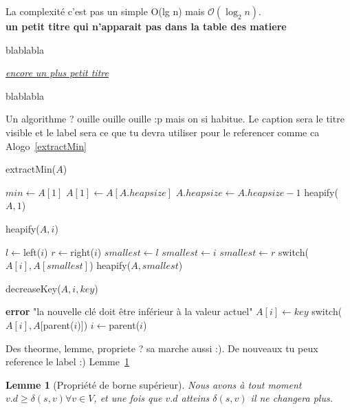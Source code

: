 \documentclass[12pt,a4paper,final]{article}
\newcommand{\smalltitle}[1]{\bigskip\large\textbf{#1}\par\normalsize\medskip}
\newcommand{\partitle}[1]{\bigskip\textit{\underline{#1}}\par\medskip}
\newtheorem{lemme}{Lemme}
\begin{document}
La complexité c'est pas un simple O(lg n) mais $\mathcal{O}(\log_2 n)$.\\

\smalltitle{un petit titre qui n'apparait pas dans la table des matiere}
blablabla

\partitle{encore un plus petit titre}
blablabla

Un algorithme ? ouille ouille ouille :p mais on si habitue. Le caption sera le titre visible et le label sera ce que tu devra utiliser pour le referencer comme ca Alogo~\ref{extractMin}

\begin{algorithm}[H]
\caption{extractMin($A$)}\label{extractMin}
\begin{algorithmic}[1]
\STATE $min\gets A[1]$
\STATE $A[1]\gets A[A.heapsize]$
\STATE $A.heapsize\gets A.heapsize - 1$
\STATE heapify($A, 1$)
\end{algorithmic}
\end{algorithm}

\begin{algorithm}[H]
\caption{heapify($A,i$)}\label{heapify}
\begin{algorithmic}[1]
\STATE $l\gets $left($i$)
\STATE $r\gets $right($i$)
\STATE $smallest\gets l$
\ELSE
\STATE $smallest\gets i$
\ENDIF
{}
\STATE $smallest\gets r$
\ENDIF
{}
\STATE switch($A[i], A[smallest]$)
\STATE heapify($A, smallest$)
\ENDIF
\end{algorithmic}
\end{algorithm}

\begin{algorithm}[H]
\caption{decreaseKey($A,i,key$)}\label{heapify}
\begin{algorithmic}[1]
\STATE \textbf{error} "la nouvelle clé doit être inférieur à la valeur actuel"
\ENDIF
\STATE $A[i]\gets key$
\STATE switch($A[i],A[$parent($i$)$]$)
\STATE $i\gets $parent($i$)
\ENDWHILE
\end{algorithmic}
\end{algorithm}

Des theorme, lemme, propriete ? sa marche aussi :). De nouveaux tu peux reference le label :) Lemme~\ref{upper-bound_prop}

\begin{lemme}[Propriété de borne supérieur]\label{upper-bound_prop}
Nous avons à tout moment $v.d \geq \delta(s,v) \forall v \in V$, et une fois que $v.d$ atteins $\delta(s,v)$ il ne changera plus.
\end{lemme}
\end{document}
